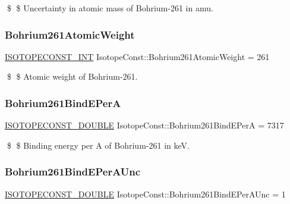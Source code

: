\$ \$ Uncertainty in atomic mass of Bohrium-\/261 in amu. \mbox{\label{group___isotope_const-_bohrium-_bh261_ga88854ff01aafb1e55abb52d2f5cabbe4}} 
\subsubsection{\texorpdfstring{Bohrium261\+Atomic\+Weight}{Bohrium261AtomicWeight}}
{\footnotesize\ttfamily \mbox{\hyperlink{group___isotope_const-_macros_ga5f18360b3e99483a35c32d789e62621c}{I\+S\+O\+T\+O\+P\+E\+C\+O\+N\+S\+T\+\_\+\+I\+NT}} Isotope\+Const\+::\+Bohrium261\+Atomic\+Weight = 261}

\$ \$ Atomic weight of Bohrium-\/261. \mbox{\label{group___isotope_const-_bohrium-_bh261_gafe118e99397474827e21b5d96323aef2}} 
\subsubsection{\texorpdfstring{Bohrium261\+Bind\+E\+PerA}{Bohrium261BindEPerA}}
{\footnotesize\ttfamily \mbox{\hyperlink{group___isotope_const-_macros_ga8f45a7272ce02c0b4c65c44636ed719a}{I\+S\+O\+T\+O\+P\+E\+C\+O\+N\+S\+T\+\_\+\+D\+O\+U\+B\+LE}} Isotope\+Const\+::\+Bohrium261\+Bind\+E\+PerA = 7317}

\$ \$ Binding energy per A of Bohrium-\/261 in keV. \mbox{\label{group___isotope_const-_bohrium-_bh261_gaed632290b4234216d0935919873f18ec}} 
\subsubsection{\texorpdfstring{Bohrium261\+Bind\+E\+Per\+A\+Unc}{Bohrium261BindEPerAUnc}}
{\footnotesize\ttfamily \mbox{\hyperlink{group___isotope_const-_macros_ga8f45a7272ce02c0b4c65c44636ed719a}{I\+S\+O\+T\+O\+P\+E\+C\+O\+N\+S\+T\+\_\+\+D\+O\+U\+B\+LE}} Isotope\+Const\+::\+Bohrium261\+Bind\+E\+Per\+A\+Unc = 1}

